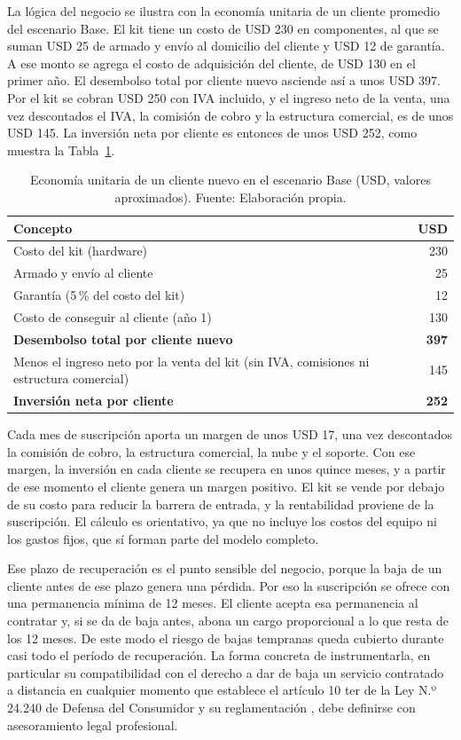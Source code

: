 La lógica del negocio se ilustra con la economía unitaria de un cliente promedio del escenario Base.
El kit tiene un costo de USD 230 en componentes, al que se suman USD 25 de armado y envío al domicilio del cliente y USD 12 de garantía.
A ese monto se agrega el costo de adquisición del cliente, de USD 130 en el primer año.
El desembolso total por cliente nuevo asciende así a unos USD 397.
Por el kit se cobran USD 250 con IVA incluido, y el ingreso neto de la venta, una vez descontados el IVA, la comisión de cobro y la estructura comercial, es de unos USD 145.
La inversión neta por cliente es entonces de unos USD 252, como muestra la Tabla~\ref{tab:cuenta-cliente}.

\begin{table}[H]
\centering
\caption[Economía unitaria de un cliente nuevo en el escenario Base.]{Economía unitaria de un cliente nuevo en el escenario Base (USD, valores aproximados). Fuente: Elaboración propia.}
\label{tab:cuenta-cliente}
\begin{tabular}{|p{8.2cm}|r|}
\hline
\textbf{Concepto} & \textbf{USD} \\
\hline
Costo del kit (hardware) & 230 \\
\hline
Armado y envío al cliente & 25 \\
\hline
Garantía (5\,\% del costo del kit) & 12 \\
\hline
Costo de conseguir al cliente (año 1) & 130 \\
\hline
\textbf{Desembolso total por cliente nuevo} & \textbf{397} \\
\hline
Menos el ingreso neto por la venta del kit (sin IVA, comisiones ni estructura comercial) & 145 \\
\hline
\textbf{Inversión neta por cliente} & \textbf{252} \\
\hline
\end{tabular}
\end{table}

Cada mes de suscripción aporta un margen de unos USD 17, una vez descontados la comisión de cobro, la estructura comercial, la nube y el soporte.
Con ese margen, la inversión en cada cliente se recupera en unos quince meses, y a partir de ese momento el cliente genera un margen positivo.
El kit se vende por debajo de su costo para reducir la barrera de entrada, y la rentabilidad proviene de la suscripción.
El cálculo es orientativo, ya que no incluye los costos del equipo ni los gastos fijos, que sí forman parte del modelo completo.

Ese plazo de recuperación es el punto sensible del negocio, porque la baja de un cliente antes de ese plazo genera una pérdida.
Por eso la suscripción se ofrece con una permanencia mínima de 12 meses.
El cliente acepta esa permanencia al contratar y, si se da de baja antes, abona un cargo proporcional a lo que resta de los 12 meses.
De este modo el riesgo de bajas tempranas queda cubierto durante casi todo el período de recuperación.
La forma concreta de instrumentarla, en particular su compatibilidad con el derecho a dar de baja un servicio contratado a distancia en cualquier momento que establece el artículo 10 ter de la Ley N.º 24.240 de Defensa del Consumidor y su reglamentación \parencite{Argentina2018}, debe definirse con asesoramiento legal profesional.

